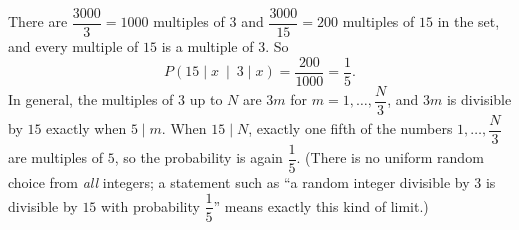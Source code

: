 There are $\dfrac{3000}{3}=1000$ multiples of $3$ and $\dfrac{3000}{15}=200$ multiples of $15$ in the set, and every multiple of $15$ is a multiple of $3$. So
\[P(15\mid x\ \mid\ 3\mid x)=\dfrac{200}{1000}=\boxed{\dfrac15}.\]
In general, the multiples of $3$ up to $N$ are $3m$ for $m=1,\dots,\dfrac N3$, and $3m$ is divisible by $15$ exactly when $5\mid m$. When $15\mid N$, exactly one fifth of the numbers $1,\dots,\dfrac N3$ are multiples of $5$, so the probability is again $\dfrac15$. (There is no uniform random choice from \emph{all} integers; a statement such as ``a random integer divisible by $3$ is divisible by $15$ with probability $\dfrac15$'' means exactly this kind of limit.)
